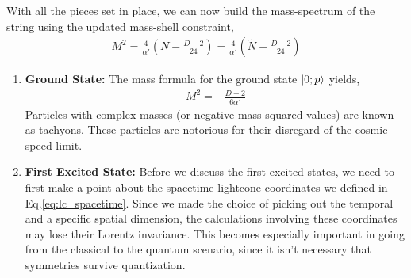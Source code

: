 \documentclass{article}
\providecommand{\brak}[1]{\ensuremath{\left(#1\right)}} %
\begin{document}
With all the pieces set in place, we can now build the mass-spectrum of the string using the updated mass-shell constraint,
\begin{align}
    M^2 = \frac{4}{\alpha'}\brak{N-\frac{D-2}{24}} = \frac{4}{\alpha'}\brak{\tilde{N}-\frac{D-2}{24}}
\end{align}
\begin{enumerate}	
	\item \textbf{Ground State:} The mass formula for the ground state $\ket{0;p}$ yields,
    \begin{align}
        M^2=-\frac{D-2}{6\alpha'}
    \end{align}
    Particles with complex masses (or negative mass-squared values) are known as tachyons. These particles are notorious for their disregard of the cosmic speed limit.
	\item \textbf{First Excited State:} Before we discuss the first excited states, we need to first make a point about the spacetime lightcone coordinates we defined in Eq.\eqref{eq:lc_spacetime}. Since we made the choice of picking out the temporal and a specific spatial dimension, the calculations involving these coordinates may lose their Lorentz invariance. This becomes especially important in going from the classical to the quantum scenario, since it isn't necessary that symmetries survive quantization.\\


\end{enumerate}
\end{document}
